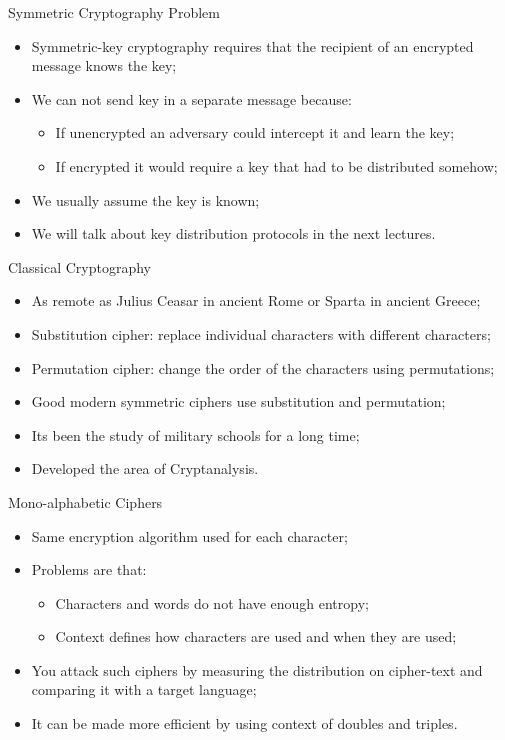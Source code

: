 \documentclass[12pt,table,xcolor={dvipsnames}]{beamer}
\begin{document}
\begin{frame}{Symmetric Cryptography Problem}
\begin{itemize}
\item Symmetric-key cryptography requires that the recipient of an encrypted message knows the key;\pause
\item We can not send key in a separate message because:\pause
\begin{itemize}
\item If unencrypted an adversary could intercept it and learn the key;\pause
\item If encrypted it would require a key that had to be distributed somehow;\pause
\end{itemize} 
\item We usually assume the key is known;\pause
\item We will talk about key distribution protocols in the next lectures.
\end{itemize}
\end{frame}

\begin{frame}{Classical Cryptography}
\begin{itemize}
\item As remote as Julius Ceasar in ancient Rome or Sparta in ancient Greece;\pause
\item Substitution cipher: replace individual characters with different characters;\pause
\item Permutation cipher: change the order of the characters using permutations;\pause
\item Good modern symmetric ciphers use substitution and permutation;\pause
\item Its been the study of military schools for a long time;\pause
\item Developed the area of Cryptanalysis.
\end{itemize}
\end{frame}

\begin{frame}{Mono-alphabetic Ciphers}
\begin{itemize}
\item Same encryption algorithm used for each character;\pause
\item Problems are that:\pause
\begin{itemize}
\item Characters and words do not have enough entropy;\pause
\item Context defines how characters are used and when they are used;\pause
\end{itemize}
\item You attack such ciphers by measuring the distribution on cipher-text and comparing it with a target language;\pause
\item It can be made more efficient by using context of doubles and triples.
\end{itemize}
\end{frame}
\end{document}
